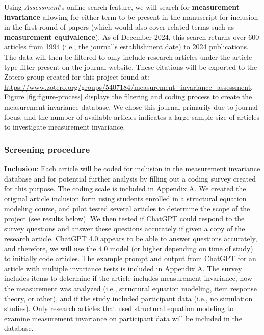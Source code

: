 \documentclass[
  english,
  man]{apa7}
\begin{document}
Using \emph{Assessment}'s online search feature, we will search for \textbf{measurement invariance} allowing for either term to be present in the manuscript for inclusion in the first round of papers (which would also cover related terms such as \textbf{measurement equivalence}). As of December 2024, this search returns over 600 articles from 1994 (i.e., the journal's establishment date) to 2024 publications. The data will then be filtered to only include research articles under the article type filter present on the journal website. These citations will be exported to the Zotero group created for this project found at: \url{https://www.zotero.org/groups/5407184/measurement_invariance_assessment}. Figure \ref{fig:figure-process} displays the filtering and coding process to create the measurement invariance database. We chose this journal primarily due to journal focus, and the number of available articles indicates a large sample size of articles to investigate measurement invariance.

\subsubsection{Screening procedure}\label{screening-procedure}

\textbf{Inclusion}: Each article will be coded for inclusion in the measurement invariance database and for potential further analysis by filling out a coding survey created for this purpose. The coding scale is included in Appendix A. We created the original article inclusion form using students enrolled in a structural equation modeling course, and pilot tested several articles to determine the scope of the project (see results below). We then tested if ChatGPT could respond to the survey questions and answer these questions accurately if given a copy of the research article. ChatGPT 4.0 appears to be able to answer questions accurately, and therefore, we will use the 4.0 model (or higher depending on time of study) to initially code articles. The example prompt and output from ChatGPT for an article with multiple invariance tests is included in Appendix A. The survey includes items to determine if the article includes measurement invariance, how the measurement was analyzed (i.e., structural equation modeling, item response theory, or other), and if the study included participant data (i.e., no simulation studies). Only research articles that used structural equation modeling to examine measurement invariance on participant data will be included in the database.
\end{document}
